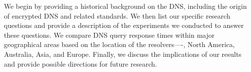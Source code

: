 We begin by providing a historical background on the DNS, including the origin of encrypted DNS and related standards.
We then list our specific research questions and provide a description of the experiments we conducted to answer these questions.
We compare DNS query response times within major geographical areas based on the location of the resolvers—-\ie, North America, Australia, Asia, and Europe.
Finally, we discuss the implications of our results and provide possible directions for future research.
